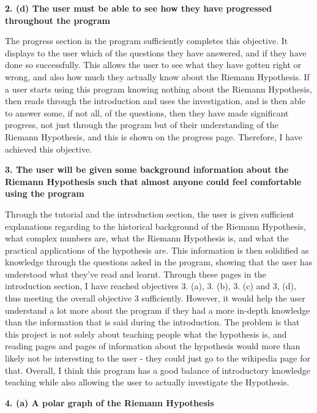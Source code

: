 \documentclass{article}
\begin{document}
\textbf{2. (d) The user must be able to see how they have progressed throughout the program}

The progress section in the program sufficiently completes this objective. It displays to the user which of the questions they have answered, and if they have done so successfully. This allows the user to see what they have gotten right or wrong, and also how much they actually know about the Riemann Hypothesis. If a user starts using this program knowing nothing about the Riemann Hypothesis, then reads through the introduction and uses the investigation, and is then able to answer some, if not all, of the questions, then they have made significant progress, not just through the program but of their understanding of the Riemann Hypothesis, and this is shown on the progress page. Therefore, I have achieved this objective.

\textbf{3. The user will be given some background information about the Riemann Hypothesis such that almost anyone could feel comfortable using the program}

Through the tutorial and the introduction section, the user is given sufficient explanations regarding to the historical background of the Riemann Hypothesis, what complex numbers are, what the Riemann Hypothesis is, and what the practical applications of the hypothesis are. This information is then solidified as knowledge through the questions asked in the program, showing that the user has understood what they've read and learnt. Through these pages in the introduction section, I have reached objectives 3. (a), 3. (b), 3. (c) and 3, (d), thus meeting the overall objective 3 sufficiently. However, it would help the user understand a lot more about the program if they had a more in-depth knowledge than the information that is said during the introduction. The problem is that this project is not solely about teaching people what the hypothesis is, and reading pages and pages of information about the hypothesis would more than likely not be interesting to the user - they could just go to the wikipedia page for that. Overall, I think this program has a good balance of introductory knowledge teaching while also allowing the user to actually investigate the Hypothesis.


\textbf{4. (a) A polar graph of the Riemann Hypothesis}
\end{document}
